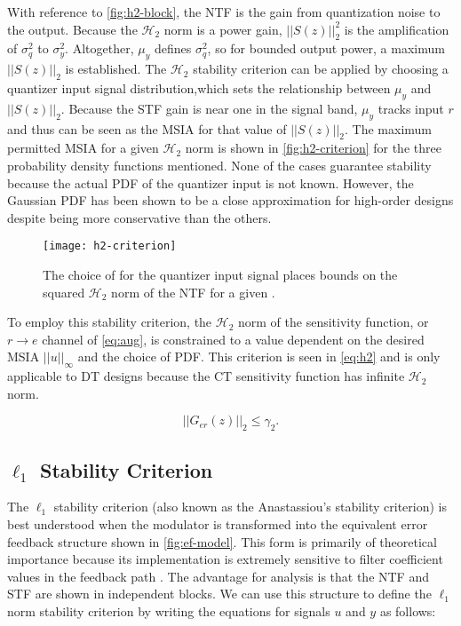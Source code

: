 With reference to \autoref{fig:h2-block}, the \gls{NTF} is the gain from quantization noise to the output. Because the $\mathcal{H}_2$ norm is a power gain, $||S(z)||_2^2$ is the amplification of $\sigma_q^2$ to $\sigma_y^2$. Altogether, $\mu_y$ defines $\sigma_q^2$, so for bounded output power, a maximum $||S(z)||_2$ is established. The $\mathcal{H}_2$ stability criterion can be applied by choosing a quantizer input signal distribution,which sets the relationship between $\mu_y$ and $||S(z)||_2$. Because the \gls{STF} gain is near one in the signal band, $\mu_y$ tracks input $r$ and thus can be seen as the \gls{MSIA} for that value of $||S(z)||_2$. The maximum permitted \gls{MSIA} for a given $\mathcal{H}_2$ norm is shown in \autoref{fig:h2-criterion} for the three probability density functions mentioned. None of the cases guarantee stability because the actual \gls{PDF} of the quantizer input is not known. However, the Gaussian \gls{PDF} has been shown to be a close approximation for high-order designs \cite{Risbo1994} despite being more conservative than the others. 

\begin{figure}
	\centering
	\texttt{[image: h2-criterion]}
	\caption{The choice of  for the quantizer input signal places bounds on the squared $\mathcal{H}_2$ norm of the \gls{NTF} for a given  \cite{Risbo1994}.} \label{fig:h2-criterion}
\end{figure}

To employ this stability criterion, the $\mathcal{H}_2$ norm of the sensitivity function, or $r \rightarrow e$ channel of \autoref{eq:aug}, is constrained to a value dependent on the desired \gls{MSIA} $||u||_\infty$ and the choice of \gls{PDF}. This criterion is seen in \autoref{eq:h2} and is only applicable to \gls{DT} designs because the \gls{CT} sensitivity function has infinite $\mathcal{H}_2$ norm.

\begin{equation}
	||G_{er}(z)||_2 \leq \gamma_2. \label{eq:h2}
\end{equation}
 
 \subsection{$\ell_1$ Stability Criterion}
 \label{sec:stab-l1}
 
 The $\ell_1$ stability criterion (also known as the Anastassiou's stability criterion) is best understood when the modulator is transformed into the equivalent error feedback structure shown in \autoref{fig:ef-model}. This form is primarily of theoretical importance because its implementation is extremely sensitive to filter coefficient values in the feedback path \cite{Schreier1997}. The advantage for analysis is that the \gls{NTF} and \gls{STF} are shown in independent blocks. We can use this structure to define the $\ell_1$ norm stability criterion by writing the equations for signals $u$ and $y$ as follows:
 
